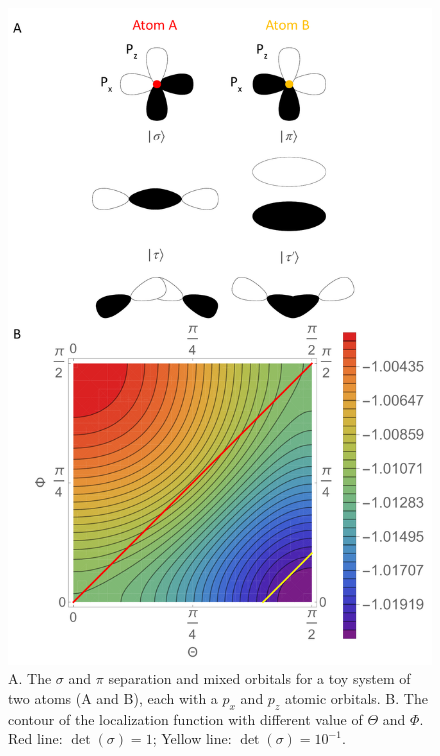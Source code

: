 \documentclass[aps,prl,reprint,amsmath,amssymb]{revtex4-1}
\begin{document}
\begin{figure}[hbpt]
\centering
\includegraphics[scale=0.35]{sigma_pi_mixing.pdf}
\caption{A. The $\sigma$ and $\pi$ separation and mixed orbitals for a toy system of two atoms (A and B), each with a $p_x$ and $p_z$ atomic orbitals. B. The contour of the localization function with different value of $\Theta$ and $\Phi$. Red line: $\det(\sigma) = 1$; Yellow line: $\det(\sigma) = 10^{-1}$.}
\label{fig:sigma_pi_mixing}
\end{figure}
\end{document}
